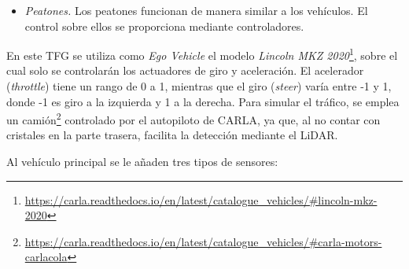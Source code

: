 \begin{itemize}
	\begin{code}[h]
	\begin{lstlisting}[language=python]
	
	vehicle_vp = world.get_blueprint_library().find(vehicle_type)
	vehicle_vp.set_attribute('role_name', 'hero') # Ego vehicle
	ego_vehicle = world.spawn_actor(vehicle_bp, transform)
	ego_vehicle.apply_control(carla.VehicleControl(throttle=0.5, steer=0.1, brake=0.01))

	\end{lstlisting}
	\caption[Configuración de \textit{Ego Vehicle} en CARLA]{Configuración de \textit{Ego Vehicle} en CARLA.}
	\label{cod:ego_carla}
	\end{code}
    \item \textit{Peatones.} Los peatones funcionan de manera similar a los vehículos. El control sobre ellos se proporciona mediante controladores.
\end{itemize}

En este \ac{TFG} se utiliza como \textit{Ego Vehicle} el modelo \textit{Lincoln MKZ 2020}\footnote{\url{https://carla.readthedocs.io/en/latest/catalogue_vehicles/\#lincoln-mkz-2020}}, sobre el cual solo se controlarán los actuadores de giro y aceleración. El acelerador (\textit{throttle}) tiene un rango de 0 a 1, mientras que el giro (\textit{steer}) varía entre -1 y 1, donde -1 es giro a la izquierda y 1 a la derecha. Para simular el tráfico, se emplea un camión\footnote{\url{https://carla.readthedocs.io/en/latest/catalogue_vehicles/\#carla-motors-carlacola}} controlado por el autopiloto de CARLA, ya que, al no contar con cristales en la parte trasera, facilita la detección mediante el \ac{LiDAR}.

Al vehículo principal se le añaden tres tipos de sensores:

